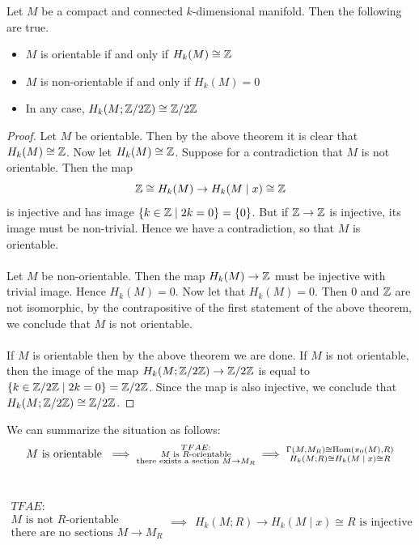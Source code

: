 \documentclass[a4paper]{article}
\begin{document}
\begin{crl}{}{} Let $M$ be a compact and connected $k$-dimensional manifold. Then the following are true. 
\begin{itemize}
\item $M$ is orientable if and only if $H_k(M)\cong\mathbb{Z}$
\item $M$ is non-orientable if and only if $H_k(M)=0$
\item In any case, $H_k(M;\mathbb{Z}/2\mathbb{Z})\cong\mathbb{Z}/2\mathbb{Z}$
\end{itemize} \tcbline
\begin{proof}
Let $M$ be orientable. Then by the above theorem it is clear that $H_k(M)\cong\mathbb{Z}$. Now let $H_k(M)\cong\mathbb{Z}$. Suppose for a contradiction that $M$ is not orientable. Then the map $$\mathbb{Z}\cong H_k(M)\to H_k(M\;|\;x)\cong\mathbb{Z}$$ is injective and has image $\{k\in\mathbb{Z}\;|\;2k=0\}=\{0\}$. But if $\mathbb{Z}\to\mathbb{Z}$ is injective, its image must be non-trivial. Hence we have a contradiction, so that $M$ is orientable. \\~\\

Let $M$ be non-orientable. Then the map $H_k(M)\to\mathbb{Z}$ must be injective with trivial image. Hence $H_k(M)=0$. Now let that $H_k(M)=0$. Then $0$ and $\mathbb{Z}$ are not isomorphic, by the contrapositive of the first statement of the above theorem, we conclude that $M$ is not orientable. \\~\\

If $M$ is orientable then by the above theorem we are done. If $M$ is not orientable, then the image of the map $H_k(M;\mathbb{Z}/2\mathbb{Z})\to\mathbb{Z}/2\mathbb{Z}$ is equal to $\{k\in\mathbb{Z}/2\mathbb{Z}\;|\;2k=0\}=\mathbb{Z}/2\mathbb{Z}$. Since the map is also injective, we conclude that $H_k(M;\mathbb{Z}/2\mathbb{Z})\cong\mathbb{Z}/2\mathbb{Z}$. 
\end{proof}
\end{crl}

We can summarize the situation as follows: $$M\text{ is orientable }\implies\substack{TFAE:\\M\text{ is }R\text{-orientable}\\\text{there exists a section }M\to M_R\\}\implies\substack{\Gamma(M,M_R)\cong\operatorname{Hom}(\pi_0(M),R)\\H_k(M;R)\cong H_k(M\;|\;x)\cong R}$$~

$$\substack{TFAE:\\M\text{ is not }R\text{-orientable}\\\text{there are no sections }M\to M_R\\}\implies\substack{H_k(M;R)\longrightarrow H_k(M\;|\;x)\cong R\text{ is injective}}$$
\end{document}
